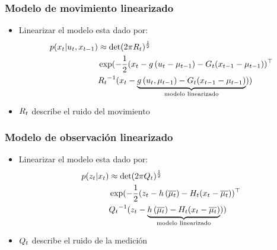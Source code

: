 \begin{frame}
	\frametitle{Modelo de movimiento linearizado}
	
	\begin{itemize}
		\item Linearizar el modelo esta dado por:
	\begin{align*}
		p(x_{t} | u_{t}, x_{t-1}) &\approx \det(2 \pi R_{t})^{\frac{1}{2}}\\
		&\exp (-\dfrac{1}{2} (x_{t} - g\left( u_{t}-\mu_{t-1} \right) - G_{t}(x_{t-1}-\mu_{t-1}))^{\top}\\
		&{R_{t}}^{-1} (x_{t} - \underbrace{g\left( u_{t},\mu_{t-1} \right) - G_{t} (x_{t-1}-\mu_{t-1})}_{\text{modelo linearizado}}))
	\end{align*}
	
	\item $R_{t}$ describe el ruido del movimiento
	\end{itemize}	
\end{frame}

\begin{frame}
	\frametitle{Modelo de observación linearizado}
	
	\begin{itemize}
		\item Linearizar el modelo esta dado por:
		\begin{align*}
			p(z_{t} | x_{t}) &\approx \det(2 \pi Q_{t})^{\frac{1}{2}}\\
			&\exp (-\dfrac{1}{2} (z_{t} - h\left( \overline{\mu_{t}} \right) - H_{t}(x_{t} - \overline{\mu_{t}}))^{\top}\\
			&{Q_{t}}^{-1} (z_{t} - \underbrace{h\left( \overline{\mu_{t}} \right) - H_{t} (x_{t}-\overline{\mu_{t}})}_{\text{modelo linearizado}}))
		\end{align*}
		
		\item $Q_{t}$ describe el ruido de la medición
	\end{itemize}	
	
	
\end{frame}

